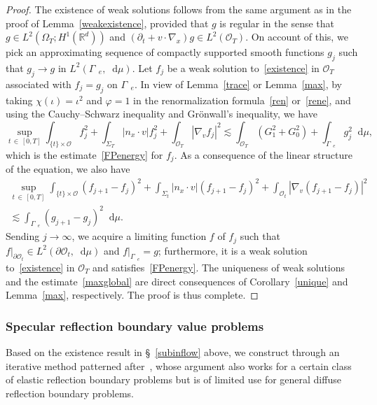 \documentclass[10pt]{amsart}
\theoremstyle{definition}\newtheorem{defi}[theo]{Definition}\newtheorem{rema}[theo]{Remark}\newtheorem{exam}[theo]{Example}\newtheorem{exem}[theo]{Example}\newtheorem{nota}[theo]{Notation}
\newcommand*{\dif}{\mathop{}\!\mathrm{d}}
\newcommand*\p{\partial}
\newcommand*\R {\mathbb{R}}
\newcommand*\Ge {\Gamma_{\;\!\!\;\!\!e}}
\newcommand*\OO {\mathcal{O}}
\begin{document}
\begin{proof}
The existence of weak solutions follows from the same argument as in the proof of Lemma~\ref{weakexistence}, provided that $g$ is regular in the sense that $g\in L^2(\Omega_T;H^1(\R^d))$ and $(\p_t+v\cdot\nabla_x)g\in L^2(\OO_T)$. On account of this, we pick an approximating sequence of compactly supported smooth functions $g_j$ such that $g_j\rightarrow g$ in $L^2(\Ge,\dif\mu)$. Let $f_j$ be a weak solution to~\eqref{existence} in $\OO_T$ associated with $f_j=g_j$ on $\Ge$. In view of Lemma~\ref{trace} or Lemma~\ref{max}, by taking $\chi(\iota)=\iota^2$ and $\varphi=1$ in the renormalization formula~\eqref{ren} or~\eqref{rene}, and using the Cauchy--Schwarz inequality and Gr\"onwall's inequality, we have
\[
\sup_{t\,\in\,[0,T]}\int_{\{t\}\times\OO}f_j^2 +\int_{\Sigma_T} |n_x\cdot v| f_j^2 +\int_{\OO_T}
\left|\nabla_vf_j\right|^2
\lesssim \int_{\OO_T}\left(G_1^2+G_0^2\right) +\int_{\Ge}g_j^2\dif\mu,
\]
which is the estimate~\eqref{FPenergy} for $f_j$. As a consequence of the linear structure of the equation, we also have
\begin{multline*}
\sup_{t\,\in\,[0,T]}\int_{\{t\}\times\OO}\left(f_{j+1}-f_{j}\right)^2 +\int_{\Sigma_t} |n_x\cdot v| \left(f_{j+1}-f_{j}\right)^2 +\int_{\OO_t}\left|\nabla_v\left(f_{j+1}-f_{j}\right)\right|^2\\
\lesssim \int_{\Ge}\left(g_{j+1}-g_{j}\right)^2\dif\mu.
\end{multline*}
Sending $j\rightarrow\infty$, we acquire a limiting function $f$ of $f_j$ such that $f|_{\p\OO_t}\in L^2(\p\OO_t,\dif\mu)$ and $f|_{\Ge}=g$; furthermore, it is a weak solution to~\eqref{existence} in $\OO_T$ and satisfies~\eqref{FPenergy}. The uniqueness of weak solutions and the estimate~\eqref{maxglobal} are direct consequences of Corollary~\ref{unique} and Lemma~\ref{max}, respectively. The proof is thus complete.
\end{proof}

\subsubsection{Specular reflection boundary value problems}

Based on the existence result in \S~\ref{subinflow} above, we construct through an iterative method patterned after~\cite{Carrillo}, whose argument also works for a certain class of elastic reflection boundary problems but is of limited use for general diffuse reflection boundary problems.
\end{document}
